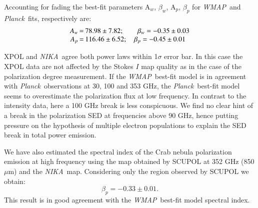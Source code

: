 \documentclass[twocolumn,traditabstract]{aa}
\def\NIKA{\textit{NIKA}}
\def\Planck{\textit{Planck}}
\def\WMAP{\textit{WMAP}}
\begin{document}
Accounting for fading the best-fit parameters A$_w$, $\beta_w$, A$_p$, $\beta_p$ for \WMAP\ and \Planck\ fits, respectively are:
$$
\setlength\arraycolsep{0.1em}
 \begin{array}{rclcl}
  A_w&=& 78.98\pm7.82 ; \quad \quad   \beta_w = -0.35\pm0.03\\
  A_p&=& 116.46\pm6.52 ; \quad \beta_p = -0.45\pm0.01
 \end{array}
$$

XPOL and \NIKA\ agree both power laws within 1$\sigma$ error bar. In this case the XPOL data are not affected by the Stokes $I$ map quality as in the case of the polarization degree measurement.
If the \WMAP\ best-fit model is in agreement with \Planck\ observations at 30, 100 and 353 GHz,  the \Planck\ best-fit model seems to overestimate the polarization flux at low frequency. In contrast
to the intensity data, here a 100 GHz break is less conspicuous.
We find no clear hint of a break in the polarization SED
at frequencies above 90 GHz, hence putting pressure on the hypothesis of multiple electron populations to explain the SED break in total power emission.

We have also estimated the spectral index of the Crab nebula polarization
emission at high frequency using the map obtained by SCUPOL \citep{scubapol} at 352 GHz (850
$\mu$m) and the \NIKA\ map. Considering only the region observed by SCUPOL we
obtain:
\begin{equation}
\beta_p = -0.33 \pm 0.01.
\end{equation}
This result is in good agreement with the \WMAP\ best-fit model spectral index.
\end{document}
